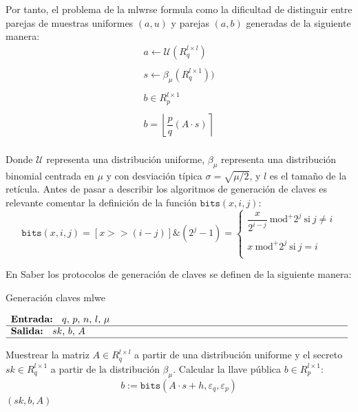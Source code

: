 Por tanto, el problema de la \acrshort{mlwr}se formula como la dificultad de distinguir entre parejas de muestras uniformes \((a,u)\) y parejas \((a,b)\) generadas de la siguiente manera:
\begin{equation}
	\begin{array}{l}
		a \leftarrow \mathcal{U}(R_q^{l\times l}) \\ \\
		s \leftarrow \beta_\mu (R_q^{l\times 1})) \\ \\
		b \in R_p^{l\times 1}\\ \\
		b=\left\lfloor \dfrac{p}{q} (A\cdot s)\right\rceil \\ 
	\end{array}
\end{equation}

Donde $\mathcal{U}$ representa una distribución uniforme,  $\beta_\mu$ representa una distribución binomial centrada en $\mu$ y con desviación típica $\sigma=\sqrt{\mu/2}$, y \(l\) es el tamaño de la retícula. Antes de pasar a describir los algoritmos de generación de claves es relevante comentar la definición de la función $\mathtt{bits}(x,i,j)$:
\begin{equation}
	\mathtt{bits}(x,i,j)=[x>>(i-j)]\& (2^j-1) =\left\{\begin{array}{l}
		\dfrac{x}{2^{i-j}}  \ \text{mod}^{+}\text{$2^j$} \ \text{si} \ j\ne i \\ \\
		x  \ \text{mod}^{+}\text{$2^j$} \ \text{si} \ j= i \\ 	
	\end{array}\right.
\end{equation}

En Saber los protocolos de generación de claves se definen de la siguiente manera:
\begin{algorithm}[H]
	\caption{Generación claves \acrshort{mlwe}} 
	$\begin{array}{p{\textwidth}}
		\textbf{Entrada: } \(q\), \(p\), \(n\), \(l\), \(\mu\)\\ 
		\hline
		\textbf{Salida: } \(sk\), \(b\), \(A\) \\ 
		\hline
	\end{array}$
	\begin{algorithmic}[1]
		\State Muestrear la matriz \(A\in R_q^{l\times l}\) a partir de una distribución uniforme y el secreto \(sk\in R_q^{l\times 1}\) a partir de la distribución \(\beta_\mu\).
		\State Calcular la llave pública \(b\in R_p^{l\times 1}\):
		\begin{equation}
			b:=\texttt{bits}(A\cdot s + h,\varepsilon_q, \varepsilon_p)
		\end{equation}
		\State \Return \((sk, b, A)\)
	\end{algorithmic}
\end{algorithm}

